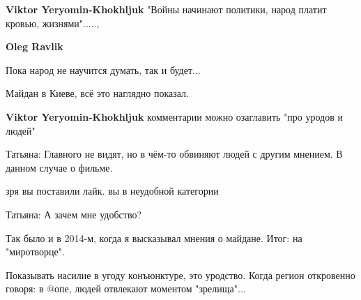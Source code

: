 \begin{itemize}
\begin{itemize}
\textbf{Viktor Yeryomin-Khokhljuk} "Войны начинают политики, народ платит кровью, жизнями".....,

 
\textbf{Oleg Ravlik}

Пока народ не научится думать, так и будет...

Майдан в Киеве, всё это наглядно показал.


\textbf{Viktor Yeryomin-Khokhljuk} комментарии можно озаглавить "про уродов и людей"

 
Татьяна: Главного не видят, но в чём-то обвиняют людей с другим мнением. В данном случае о фильме.

 
зря вы поставили лайк. вы в неудобной категории

 

Татьяна: А зачем мне удобство?

Так было и в 2014-м, когда я высказывал мнения о майдане. Итог: на
"миротворце".

Показывать насилие в угоду конъюнктуре, это уродство. Когда регион откровенно
говоря: в @опе, людей отвлекают моментом "зрелища"...

 

\end{itemize}
\end{itemize}
